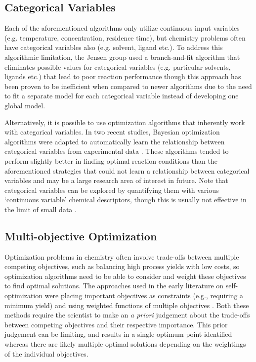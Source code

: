 \subsection{Categorical Variables}
Each of the aforementioned algorithms only utilize continuous input variables (e.g. temperature, concentration, residence time), but chemistry problems often have categorical variables also (e.g. solvent, ligand etc.). To address this algorithmic limitation, the Jensen group used a branch-and-fit algorithm that eliminates possible values for categorical variables (e.g. particular solvents, ligands etc.) that lead to poor reaction performance \cite{Reizman2016a, Baumgartner2018} though this approach has been proven to be inefficient when compared to newer algorithms due to the need to fit a separate model for each categorical variable instead of developing one global model.

Alternatively, it is possible to use optimization algorithms that inherently work with categorical variables. In two recent studies, Bayesian optimization algorithms were adapted to automatically learn the relationship between categorical variables from experimental data \cite{Manson2021, Hase2021}. These algorithms tended to perform slightly better in finding optimal reaction conditions than the aforementioned strategies that could not learn a relationship between categorical variables and may be a large research area of interest in future. Note that categorical variables can be explored by quantifying them with various ‘continuous variable’ chemical descriptors, though this is usually not effective in the limit of small data \cite{Pomberger2023}.

\subsection{Multi-objective Optimization}
Optimization problems in chemistry often involve trade-offs between multiple competing objectives, such as balancing high process yields with low costs, so optimization algorithms need to be able to consider and weight these objectives to find optimal solutions. The approaches used in the early literature on self-optimization were placing important objectives as constraints (e.g., requiring a minimum yield) \cite{Reizman2015b, Reizman2016a, Reizman2016b, Baumgartner2018} and using weighted functions of multiple objectives \cite{Krishnadasan2007, Fitzpatrick2016, Hase2018b}. Both these methods require the scientist to make an \textit{a priori} judgement about the trade-offs between competing objectives and their respective importance. This prior judgement can be limiting, and results in a single optimum point identified whereas there are likely multiple optimal solutions depending on the weightings of the individual objectives.


